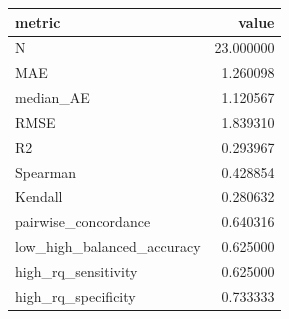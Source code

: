 \begin{tabular}{lr}
\toprule
metric & value \\
\midrule
N & 23.000000 \\
MAE & 1.260098 \\
median_AE & 1.120567 \\
RMSE & 1.839310 \\
R2 & 0.293967 \\
Spearman & 0.428854 \\
Kendall & 0.280632 \\
pairwise_concordance & 0.640316 \\
low_high_balanced_accuracy & 0.625000 \\
high_rq_sensitivity & 0.625000 \\
high_rq_specificity & 0.733333 \\
\bottomrule
\end{tabular}
